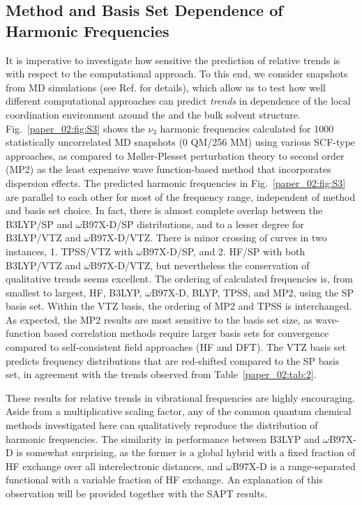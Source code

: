 \subsection{Method and Basis Set Dependence of Harmonic Frequencies}
\label{paper_02:ssec:SI3}

It is imperative to investigate how sensitive the prediction of relative trends is with respect to the computational approach. To this end, we consider snapshots from MD simulations (see Ref. \citep{Daly2016} for details), which allow us to test how well different computational approaches can predict \emph{trends} in dependence of the local coordination environment around the  and the bulk solvent structure. Fig.~\ref{paper_02:fig:S3} shows the  \(\nu_{3}\) harmonic frequencies calculated for \num{1000} statistically uncorrelated MD snapshots (0 QM/256 MM) using various SCF-type approaches, as compared to Møller-Plesset perturbation theory to second order (MP2) as the least expensive wave function-based method that incorporates dispersion effects.\cite{WCMS:WCMS58} The predicted harmonic frequencies in Fig.~\ref{paper_02:fig:S3} are parallel to each other for most of the frequency range, independent of method and basis set choice. In fact, there is almost complete overlap between the B3LYP/SP and \(\omega\)B97X-D/SP distributions, and to a lesser degree for B3LYP/VTZ and \(\omega\)B97X-D/VTZ. There is minor crossing of curves in two instances, 1. TPSS/VTZ with \(\omega\)B97X-D/SP, and 2. HF/SP with both B3LYP/VTZ and \(\omega\)B97X-D/VTZ, but nevertheless the conservation of qualitative trends seems excellent. The ordering of calculated frequencies is, from smallest to largest, HF, B3LYP, \(\omega\)B97X-D, BLYP, TPSS, and MP2, using the SP basis set. Within the VTZ basis, the ordering of MP2 and TPSS is interchanged. As expected, the MP2 results are most sensitive to the basis set size, as wave-function based correlation methods require larger basis sets for convergence compared to self-consistent field approaches (HF and DFT). The VTZ basis set predicts frequency distributions that are red-shifted compared to the SP basis set, in agreement with the trends observed from Table~\ref{paper_02:tab:2}.

These results for relative trends in vibrational frequencies are highly encouraging. Aside from a multiplicative scaling factor, any of the common quantum chemical methods investigated here can qualitatively reproduce the distribution of harmonic frequencies. The similarity in performance between B3LYP and \(\omega\)B97X-D is somewhat surprising, as the former is a global hybrid with a fixed fraction of HF exchange over all interelectronic distances, and \(\omega\)B97X-D is a range-separated functional with a variable fraction of HF exchange. An explanation of this observation will be provided together with the SAPT results.

